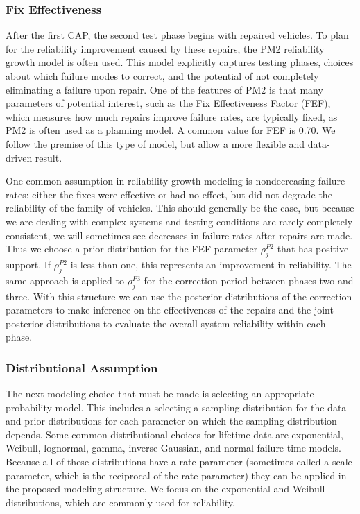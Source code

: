 \documentclass[12pt]{article}
\begin{document}
\subsubsection{Fix Effectiveness}\label{FEF}
After the first CAP, the second test phase begins with repaired vehicles. To plan for the reliability improvement caused by
these repairs, the PM2 reliability growth model \cite{ref2} is often used.
This model explicitly captures testing phases, choices about which failure modes
to correct, and the potential of not completely eliminating a failure upon
repair. One of the features of PM2 is that many parameters of potential
interest, such as the Fix Effectiveness Factor (FEF), which measures how much
repairs improve failure rates, are typically fixed, as PM2 is often used as a planning model. A common value for FEF is
0.70. We follow the premise of this type of model, but allow a more flexible and
data-driven result.

One common assumption in reliability growth modeling is nondecreasing
failure rates: either the fixes were effective or had no effect, but did
not degrade the reliability of the family of vehicles.  This should generally be the case, but
because we are dealing with complex systems and testing conditions are rarely
completely consistent, we will sometimes see decreases in failure rates after repairs are made.  Thus we choose a prior distribution for the
FEF parameter $\rho_{j}^{P2}$ that has positive support.  If
$\rho_{j}^{P2}$ is less than one, this represents an improvement in reliability.
The same approach is applied to $\rho_{j}^{P3}$ for the correction period
between phases two and three.  With this structure we can use the posterior
distributions of the correction parameters to make inference on the effectiveness
of the repairs and the joint posterior distributions to evaluate the overall system reliability within each phase.

\subsubsection{Distributional Assumption}
The next modeling choice that must be made is selecting an appropriate
probability model. This includes a selecting a sampling distribution for the data
and prior distributions for each parameter on which the sampling distribution
depends. Some common distributional choices for lifetime data are exponential, Weibull, lognormal, gamma, inverse
Gaussian, and normal failure time models.  Because all of these distributions
have a rate parameter (sometimes called a scale parameter, which is the reciprocal of the rate parameter) they can be applied in
the proposed modeling structure. We focus on the
exponential and Weibull distributions, which are commonly used for reliability.
\end{document}
